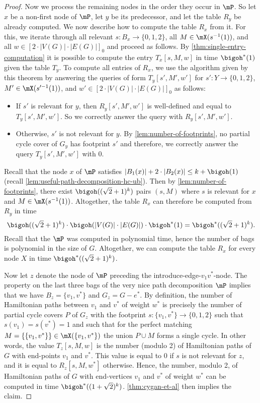 \documentclass[a4paper,UKenglish,cleveref, autoref, thm-restate]{lipics-v2021}
\begin{document}
\begin{proof}
	Now we process the remaining nodes in the order they occur in $\mP$.
	So let $x$ be a non-first node of $\mP$, let $y$ be its predecessor, and let the table $R_y$ be already computed. 
	We now describe how to compute the table $R_x$ from it.
	For this, we iterate through all relevant $s \colon B_x \to \{0, 1, 2\}$, all $M \in \mX(s^{-1}(1))$, and all $w \in [2 \cdot |V(G)| \cdot |E(G)|]_0$ and proceed as follows.
	By \cref{thm:single-entry-computation} it is possible to compute the entry $T_x[s, M, w]$ in time $\bigoh^*(1)$ given the table $T_y$. 
	To compute all entries of $R_x$, we use the algorithm given by this theorem by answering the queries of form $T_y[s', M', w']$ for $s' \colon Y \to \{0, 1, 2\}$, $M' \in \mX(s'^{-1}(1))$, and $w' \in [2 \cdot |V(G)| \cdot |E(G)|]_0$ as follows:
	\begin{itemize}
	 \item If $s'$ is relevant for $y$, then $R_y[s', M', w']$ is well-defined and equal to $T_y[s', M', w']$. So we correctly answer the query with $R_y[s', M', w']$.
	 \item Otherwise, $s'$ is not relevant for $y$. By \cref{lem:number-of-footprints}, no partial cycle cover of $G_y$ has footprint $s'$ and therefore, we correctly answer the query $T_y[s', M', w']$ with $0$.
	\end{itemize}
	Recall that the node $x$ of $\mP$ satisfies $|B_1(x)| + 2 \cdot |B_2(x)| \leq k + \bigoh(1)$ (recall \cref{lem:useful-path-decomposition-hc-ub}). 
	Then by \cref{lem:number-of-footprints}, there exist $\bigoh((\sqrt{2}+1)^k)$ pairs $(s, M)$ where $s$ is relevant for $x$ and $M \in \mX(s^{-1}(1))$.
	Altogether, the table $R_x$ can therefore be computed from $R_y$ in time
	\[
		\bigoh((\sqrt{2}+1)^k) \cdot \bigoh(|V(G)| \cdot |E(G)|) \cdot \bigoh^*(1) = \bigoh^*((\sqrt{2}+1)^k).
	\]
	Recall that the $\mP$ was computed in polynomial time, hence the number of bags is polynomial in the size of $G$. 
	Altogether, we can compute the table $R_x$ for every node $X$ in time $\bigoh^*((\sqrt{2}+1)^k)$.
	
	Now let $z$ denote the node of $\mP$ preceding the introduce-edge-$v_1 v^*$-node. 
	The property on the last three bags of the very nice path decomposition $\mP$ implies that we have $B_z = \{v_1, v^*\}$ and $G_z = G - e^*$.
	By definition, the number of Hamiltonian paths between $v_1$ and $v^*$ of weight $w^*$ is precisely the number of partial cycle covers $P$ of $G_z$ with the footprint $s \colon \{v_1, v^*\} \to \{0,1,2\}$ such that $s(v_1) = s(v^*) = 1$ and such that for the perfect matching $M = \{\{v_1, v^*\}\} \in \mX(\{v_1, v^*\})$ the union $P \cup M$ forms a single cycle.
	In other words, the value $T_z[s, M, w]$ is the number (modulo 2) of Hamiltonian paths of $G$ with end-points $v_1$ and $v^*$.
	This value is equal to $0$ if $s$ is not relevant for $z$, and it is equal to $R_z[s, M, w^*]$ otherwise.
	Hence, the number, modulo 2, of Hamiltonian paths of $G$ with end-vertices $v_1$ and $v^*$ of weight $w^*$ can be computed in time $\bigoh^*((1+\sqrt{2})^k)$.
	\cref{thm:cygan-et-al} then implies the claim.
\end{proof}
\end{document}
